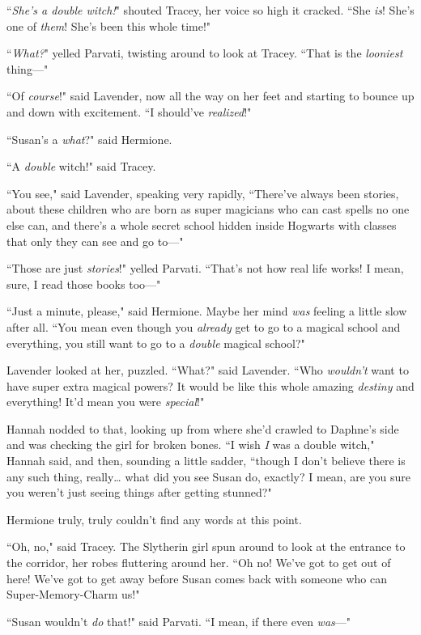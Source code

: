 ``\emph{She's a double witch!}" shouted Tracey, her voice so high it cracked. ``She \emph{is}! She's one of \emph{them}! She's been this whole time!"

``\emph{What?}" yelled Parvati, twisting around to look at Tracey. ``That is the \emph{looniest} thing—"

``Of \emph{course}!" said Lavender, now all the way on her feet and starting to bounce up and down with excitement. ``I should've \emph{realized}!"

``Susan's a \emph{what}?" said Hermione.

``A \emph{double} witch!" said Tracey.

``You see," said Lavender, speaking very rapidly, ``There've always been stories, about these children who are born as super magicians who can cast spells no one else can, and there's a whole secret school hidden inside Hogwarts with classes that only they can see and go to—"

``Those are just \emph{stories}!" yelled Parvati. ``That's not how real life works! I mean, sure, I read those books too—"

``Just a minute, please," said Hermione. Maybe her mind \emph{was} feeling a little slow after all. ``You mean even though you \emph{already} get to go to a magical school and everything, you still want to go to a \emph{double} magical school?"

Lavender looked at her, puzzled. ``What?" said Lavender. ``Who \emph{wouldn't} want to have super extra magical powers? It would be like this whole amazing \emph{destiny} and everything! It'd mean you were \emph{special}!"

Hannah nodded to that, looking up from where she'd crawled to Daphne's side and was checking the girl for broken bones. ``I wish \emph{I} was a double witch," Hannah said, and then, sounding a little sadder, ``though I don't believe there is any such thing, really{\ldots} what did you see Susan do, exactly? I mean, are you sure you weren't just seeing things after getting stunned?"

Hermione truly, truly couldn't find any words at this point.

``Oh, no," said Tracey. The Slytherin girl spun around to look at the entrance to the corridor, her robes fluttering around her. ``Oh no! We've got to get out of here! We've got to get away before Susan comes back with someone who can Super-Memory-Charm us!"

``Susan wouldn't \emph{do} that!" said Parvati. ``I mean, if there even \emph{was}—"

